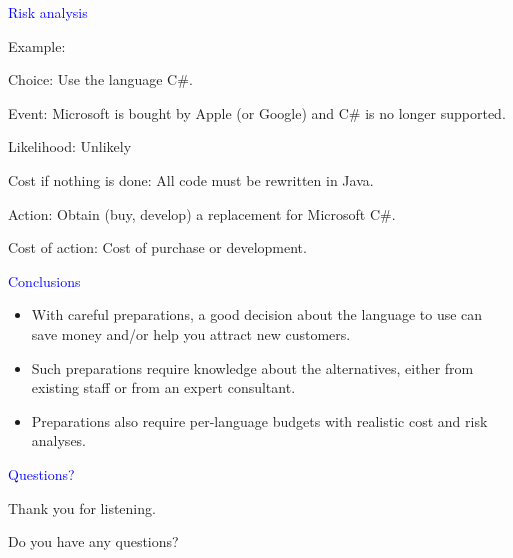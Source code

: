 \documentclass{slides}
\newcommand{\ti}[1]{\begin{center}\Large{\textcolor{blue}{#1}}\end{center}}
\begin{document}
\begin{slide}\ti{Risk analysis}

Example:

Choice: Use the language C\#.

Event: Microsoft is bought by Apple (or Google) and C\# is no longer
supported.

Likelihood: Unlikely

Cost if nothing is done: All code must be rewritten in Java.

Action: Obtain (buy, develop) a replacement for Microsoft C\#.

Cost of action: Cost of purchase or development.

\vfill\end{slide}
\begin{slide}\ti{Conclusions}

  \begin{itemize}
  \item With careful preparations, a good decision about the language
    to use can save money and/or help you attract new customers.
  \item Such preparations require knowledge about the alternatives,
    either from existing staff or from an expert consultant.
  \item Preparations also require per-language budgets with realistic
    cost and risk analyses.
  \end{itemize}

\vfill\end{slide}
\begin{slide}\ti{Questions?}

Thank you for listening.

Do you have any questions?

\vfill\end{slide}
\end{document}
